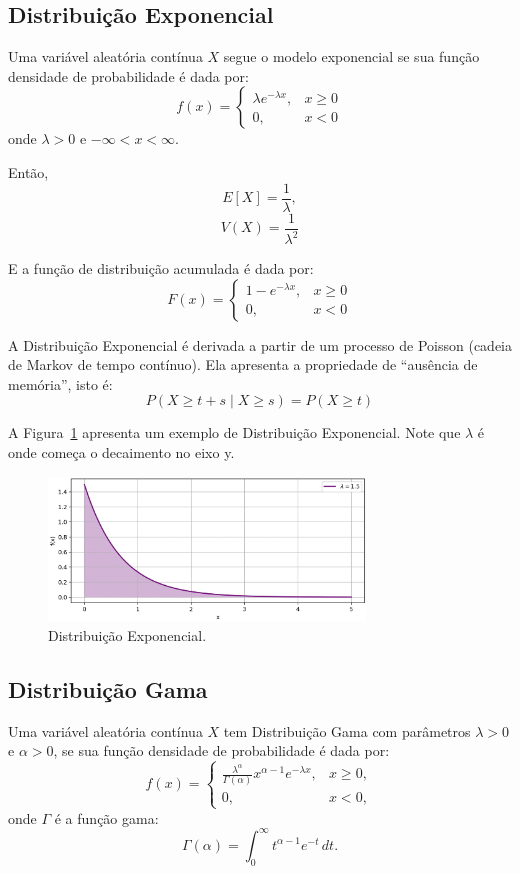 \documentclass{article}
\begin{document}
\subsection{Distribuição Exponencial}
Uma variável aleatória contínua $X$ segue o modelo exponencial se sua função densidade de probabilidade é dada por:
    $$
    f(x) = 
    \begin{cases}
    \lambda e^{-\lambda x}, & x \geq 0 \\
    0, & x < 0
    \end{cases}
    $$
onde $\lambda > 0$ e $-\infty < x < \infty$.

Então,
    $$
    E[X] = \frac{1}{\lambda},
    $$
    $$
    V(X) = \frac{1}{\lambda^2}
    $$

E a função de distribuição acumulada é dada por:
    $$
    F(x) = 
    \begin{cases}
    1 - e^{-\lambda x}, & x \geq 0 \\
    0, & x < 0
    \end{cases}
    $$

A Distribuição Exponencial é derivada a partir de um processo de Poisson (cadeia de Markov de tempo contínuo). Ela apresenta a propriedade de ``ausência de memória'', isto é:
    $$
    P(X \geq t + s \mid X \geq s) = P(X \geq t)
    $$

A Figura~\ref{fig:dist_cont_exponencial} apresenta um exemplo de Distribuição Exponencial. Note que $\lambda$ é onde começa o decaimento no eixo y.

\begin{figure}[H]
    \centering    \includegraphics[width=0.75\textwidth]{figuras/dist_cont_exponencial.png}
    \caption{Distribuição Exponencial.}
    \label{fig:dist_cont_exponencial}
\end{figure}

\subsection{Distribuição Gama}
Uma variável aleatória contínua $X$ tem Distribuição Gama com parâmetros $\lambda > 0$ e $\alpha > 0$, se sua função densidade de probabilidade é dada por:
    $$
    f(x) =
    \begin{cases}
    \frac{\lambda^\alpha}{\Gamma(\alpha)} x^{\alpha - 1} e^{-\lambda x}, & x \geq 0, \\
    0, & x < 0,
    \end{cases}
    $$
onde $\Gamma$ é a função gama:
    $$
    \Gamma(\alpha) = \int_0^{\infty} t^{\alpha - 1} e^{-t} \, dt.
    $$
\end{document}
